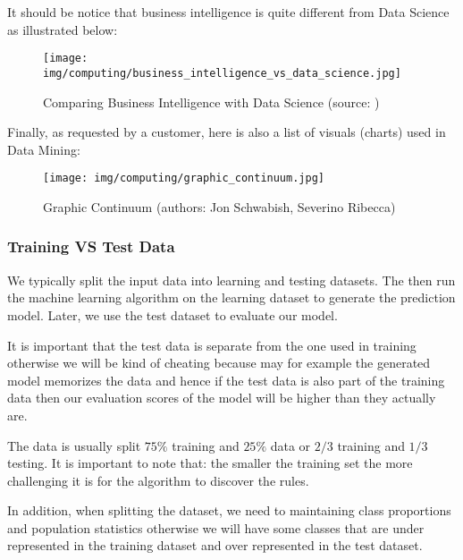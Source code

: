 	It should be notice that business intelligence is quite different from Data Science as illustrated below:
	\begin{figure}[H]
		\centering
		\texttt{[image: img/computing/business\_intelligence\_vs\_data\_science.jpg]}
		\caption[Comparing Business Intelligence with Data Science]{Comparing Business Intelligence with Data Science (source: \cite{emc2015data})}
	\end{figure}
	Finally, as requested by a customer, here is also a list of visuals (charts) used in Data Mining:
	\begin{figure}[H]
		\centering
		\texttt{[image: img/computing/graphic\_continuum.jpg]}
		\caption[Graphic Contiuum]{Graphic Continuum (authors: Jon Schwabish, Severino Ribecca)}
	\end{figure}
	
	\subsubsection{Training VS Test Data}
	We typically split the input data into learning and testing datasets. The then run the machine learning algorithm on the learning dataset to generate the prediction model. Later, we use the test dataset to evaluate our model.

	It is important that the test data is separate from the one used in training otherwise we will be kind of cheating because may for example the generated model memorizes the data and hence if the test data is also part of the training data then our evaluation scores of the model will be higher than they actually are.
	
	The data is usually split $75\%$ training and $25\%$ data or $2/3$ training and $1/3$ testing. It is important to note that: the smaller the training set the more challenging it is for the algorithm to discover the rules.
	
	In addition, when splitting the dataset, we need to maintaining class proportions and population statistics otherwise we will have some classes that are under represented in the training dataset and over represented in the test dataset.
	
